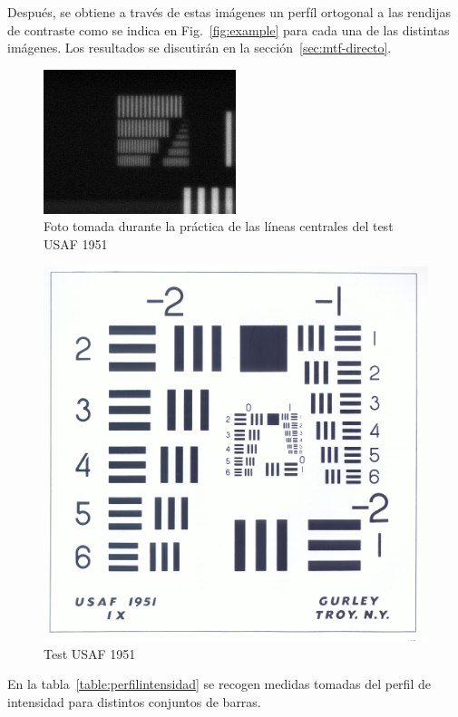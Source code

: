 \documentclass{./packages/optica-article}
\begin{document}
Después, se obtiene a través de estas imágenes un perfíl ortogonal a las rendijas de contraste como se indica en Fig.~\ref{fig:example} para cada una de las distintas imágenes. Los resultados se discutirán en la sección~\ref{sec:mtf-directo}.

\begin{figure}[p]
	\centering
	\includegraphics[width=0.5\textwidth]{smallest_lines}
	\caption{Foto tomada durante la práctica de las líneas centrales del test USAF 1951}\label{fig:usafpic}
\end{figure}

\begin{figure}[htb]
	\centering
	\includegraphics[scale=0.05]{testusaf1951}
	\caption{Test USAF 1951}\label{fig:usaf1951}
\end{figure}

En la tabla~\ref{table:perfilintensidad} se recogen medidas tomadas del perfil de intensidad para distintos conjuntos de barras.
\end{document}
